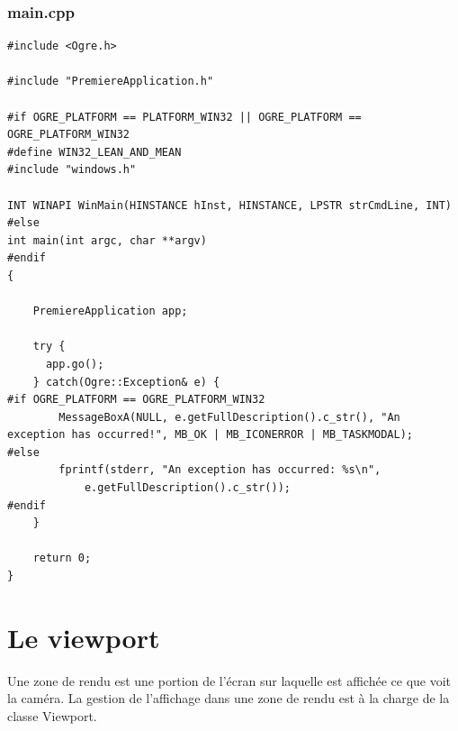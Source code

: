 \documentclass[10pt,a4paper]{report}
\begin{document}
\subsubsection{main.cpp}
\begin{lstlisting}[caption={main.cpp: Cr\'eation de la cam\'era}]
#include <Ogre.h>

#include "PremiereApplication.h"

#if OGRE_PLATFORM == PLATFORM_WIN32 || OGRE_PLATFORM == OGRE_PLATFORM_WIN32
#define WIN32_LEAN_AND_MEAN
#include "windows.h"

INT WINAPI WinMain(HINSTANCE hInst, HINSTANCE, LPSTR strCmdLine, INT)
#else
int main(int argc, char **argv)
#endif
{

    PremiereApplication app;
    
    try {
      app.go();
    } catch(Ogre::Exception& e) {
#if OGRE_PLATFORM == OGRE_PLATFORM_WIN32
        MessageBoxA(NULL, e.getFullDescription().c_str(), "An exception has occurred!", MB_OK | MB_ICONERROR | MB_TASKMODAL);
#else
        fprintf(stderr, "An exception has occurred: %s\n",
            e.getFullDescription().c_str());
#endif
    }

    return 0;
}
\end{lstlisting}




































\section{Le viewport}

Une zone de rendu est une portion de l'\'ecran sur laquelle est affich\'ee ce que voit la cam\'era. La gestion de l'affichage dans une zone de rendu est \`{a} la charge de la classe Viewport.
\end{document}
